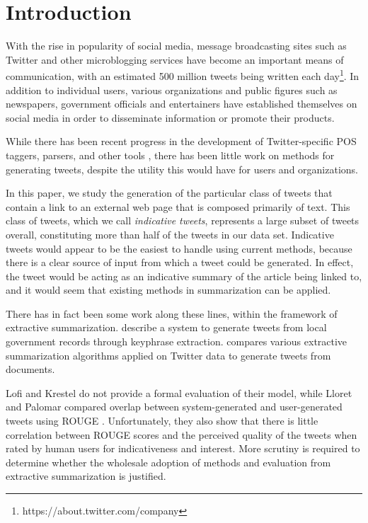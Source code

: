 \section{Introduction}
\label{sec:intro}
With the rise in popularity of social media, message broadcasting sites such as Twitter and other microblogging services have become an important means of communication, with an estimated 500 million tweets being written each day\footnote{https://about.twitter.com/company}. In addition to individual users, various organizations and public figures such as newspapers, government officials and entertainers have established themselves on social media in order to disseminate information or promote their products. 

While there has been recent progress in the development of Twitter-specific POS taggers, parsers, and other tools \cite{owoputi-etal-2013,kong-etal-2014}, there has been little work on methods for generating tweets, despite the utility this would have for users and organizations. 

In this paper, we study the generation of the particular class of tweets that contain a link to an external web page that is composed primarily of text. This class of tweets, which we call \emph{indicative tweets}, represents a large subset of tweets overall, constituting more than half of the tweets in our data set.  Indicative tweets would appear to be the easiest to handle using current methods, because there is a clear source of input from which a tweet could be generated. In effect, the tweet would be acting as an indicative summary of the article being linked to, and it would seem that existing methods in summarization can be applied. 

There has in fact been some work along these lines, within the framework of extractive summarization.  describe a system to generate tweets from local government records through keyphrase extraction.  compares various extractive summarization algorithms applied on Twitter data to generate tweets from documents. 

Lofi and Krestel do not provide a formal evaluation of their model, while Lloret and Palomar compared overlap between system-generated and user-generated tweets using ROUGE 
\cite{lin2004rouge}. Unfortunately, they also show that there is little correlation between ROUGE scores and the perceived quality of the tweets when rated by human users for indicativeness and interest. More scrutiny is required to determine whether the wholesale adoption of methods and evaluation from extractive summarization is justified.

